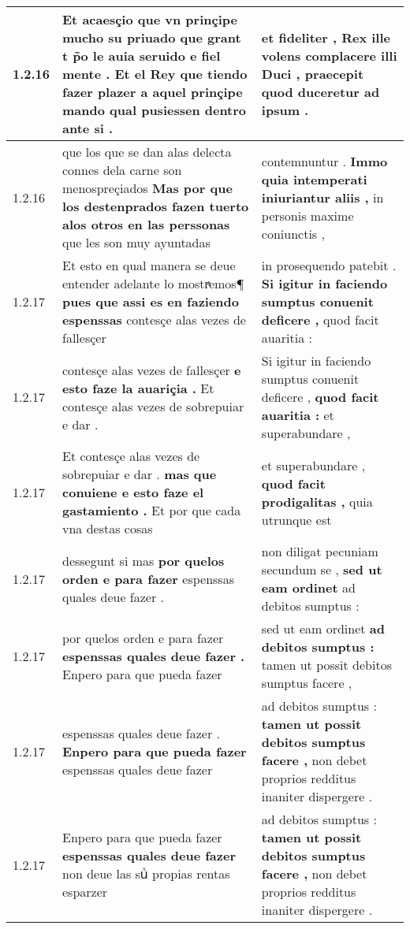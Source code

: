 \begin{tabular}{|p{1cm}|p{6.5cm}|p{6.5cm}|}
1.2.16 & Et acaesçio que vn prinçipe mucho su priuado que grant t p̃o le auia seruido e fiel mente . \textbf{ Et el Rey que tiendo fazer plazer a aquel } prinçipe mando qual pusiessen dentro ante si . & et fideliter , \textbf{ Rex ille volens complacere illi Duci , } praecepit quod duceretur ad ipsum . \\\hline
1.2.16 & que los que se dan alas delecta connes dela carne son menospreçiados \textbf{ Mas por que los destenprados fazen tuerto alos otros en las perssonas } que les son muy ayuntadas & contemnuntur . \textbf{ Immo quia intemperati iniuriantur aliis , } in personis maxime coniunctis , \\\hline
1.2.17 & Et esto en qual manera se deue entender adelante lo mostrͣemos¶ \textbf{ pues que assi es en faziendo espenssas } contesçe alas vezes de fallesçer & in prosequendo patebit . \textbf{ Si igitur in faciendo sumptus conuenit deficere , } quod facit auaritia : \\\hline
1.2.17 & contesçe alas vezes de fallesçer \textbf{ e esto faze la auariçia . } Et contesçe alas vezes de sobrepuiar e dar . & Si igitur in faciendo sumptus conuenit deficere , \textbf{ quod facit auaritia : } et superabundare , \\\hline
1.2.17 & Et contesçe alas vezes de sobrepuiar e dar . \textbf{ mas que conuiene e esto faze el gastamiento . } Et por que cada vna destas cosas & et superabundare , \textbf{ quod facit prodigalitas , } quia utrunque est \\\hline
1.2.17 & dessegunt si mas \textbf{ por quelos orden e para fazer } espenssas quales deue fazer . & non diligat pecuniam secundum se , \textbf{ sed ut eam ordinet } ad debitos sumptus : \\\hline
1.2.17 & por quelos orden e para fazer \textbf{ espenssas quales deue fazer . } Enpero para que pueda fazer & sed ut eam ordinet \textbf{ ad debitos sumptus : } tamen ut possit debitos sumptus facere , \\\hline
1.2.17 & espenssas quales deue fazer . \textbf{ Enpero para que pueda fazer } espenssas quales deue fazer & ad debitos sumptus : \textbf{ tamen ut possit debitos sumptus facere , } non debet proprios redditus inaniter dispergere . \\\hline
1.2.17 & Enpero para que pueda fazer \textbf{ espenssas quales deue fazer } non deue las suᷤ propias rentas esparzer & ad debitos sumptus : \textbf{ tamen ut possit debitos sumptus facere , } non debet proprios redditus inaniter dispergere . \\\hline

\end{tabular}
